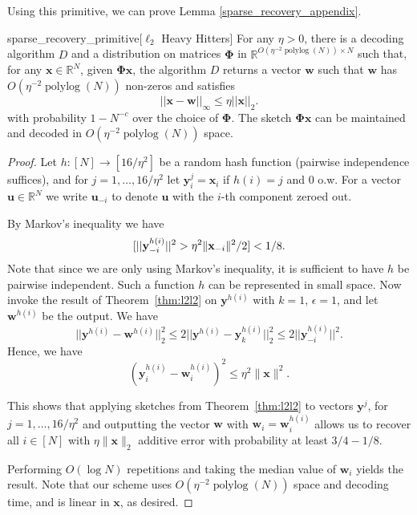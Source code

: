 \documentclass[11pt]{article}
\let\Pr\relax
\DeclareMathOperator*{\Pr}{\mathbb{P}}
\newcommand{\norm}[1]{\|#1\|}
\newcommand{\bs}[1]{\boldsymbol{#1}}
\newcommand{\bv}[1]{\mathbf{#1}}
\newcommand{\plog}{\mathop\mathrm{polylog}}
\newcommand{\R}{\mathbb{R}}
\begin{document}
Using this primitive, we can prove Lemma \ref{sparse_recovery_appendix}.

\begin{replemma}{sparse_recovery_primitive}[$\ell_2$ Heavy Hitters]
For any $\eta >0$, there is a decoding algorithm $D$ and a distribution on matrices $\bv{\Phi}$ in $\R^{O(\eta^{-2} \plog( N)) \times N}$ such that, for any $\bv{x}\in \R^N$, given $\bs{\Phi} \bv{x}$, the algorithm $D$ returns a vector $\bv{w}$ such that
$\bv{w}$ has $O(\eta^{-2}\plog( N))$ non-zeros and satisfies
$$ ||\bv{x}-\bv{w}||_\infty \leq \eta ||\bv{x}||_2.$$
with probability $1-N^{-c}$ over the choice of $\bs{\Phi}$. The sketch $\bv{\Phi} \bv{x}$ can be maintained and decoded in $O(\eta^{-2}\plog( N))$ space. 
\end{replemma}



\begin{proof}
Let $h:[N]\to [16/\eta^2]$ be a random hash function (pairwise independence suffices), and  for $j=1,\ldots, 16/\eta^2$ let $\bv{y}^j_i=\bv{x}_i$ if $h(i)=j$ and $0$ o.w. 
For a vector $\bv{u}\in \R^N$ we write $\bv{u}_{-i}$ to denote $\bv{u}$ with the $i$-th component zeroed out. 

By Markov's inequality we have
$$
\Pr[||\bv{y}^{h(i)}_{-i}||^2>\eta^2 \norm{\bv{x}_{-i}}^2/2]<1/8.
$$
Note that since we are only using Markov's inequality, it is sufficient to have $h$ be pairwise independent. Such a function $h$ can be represented in small space.
Now invoke the result of Theorem~\ref{thm:l2l2} on $\bv{y}^{h(i)}$ with $k=1$, $\epsilon=1$, and let $\bv{w}^{h(i)}$ be the output. We have 
$$
||\bv{y}^{h(i)}-\bv{w}^{h(i)}||_2^2
\leq 2||\bv{y}^{h(i)}-\bv{y}^{h(i)}_k||_2^2
\leq 2||\bv{y}^{h(i)}_{-i}||^2.
$$
Hence, we have
$$ (\bv{y}^{h(i)}_i - \bv{w}^{h(i)}_i)^2 \leq \eta^2 \norm{\bv{x}}^2.$$

This shows that applying sketches from Theorem~\ref{thm:l2l2} to vectors $\bv{y}^{j}$, for $j=1,\ldots, 16/\eta^2$ and outputting the vector $\bv{w}$ with $\bv{w}_i = \bv{w}^{h(i)}_i$ allows us to recover all $i\in [N]$ with $\eta \norm{\bv{x}}_2$ additive error with probability at least $3/4-1/8$.

Performing $O(\log N)$ repetitions and taking the median value of $\bv{w}_i$ yields the result. 
Note that our scheme uses $O(\eta^{-2} \plog(N))$ space and decoding time, and is linear in $\bv{x}$, as desired.
\end{proof}
\end{document}
